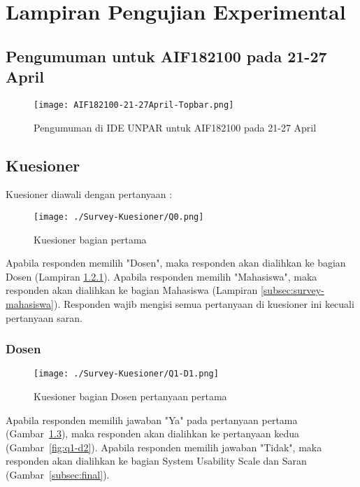 \chapter{Lampiran Pengujian Experimental}
\label{lamp:B}

\section{Pengumuman untuk AIF182100 pada 21-27 April}
\label{sec:aif182100-21-27Apr}
\begin{figure}[H]
	\centering  
	\texttt{[image: AIF182100-21-27April-Topbar.png]}  
	\caption[Pengumuman di IDE UNPAR untuk AIF182100 pada 21-27 April]{Pengumuman di IDE UNPAR untuk AIF182100 pada 21-27 April} 
	\label{fig:AIF182100-21-27Apr} 
\end{figure}


\section{Kuesioner}
\label{sec:survey}
Kuesioner diawali dengan pertanyaan :
\begin{figure}[H]
	\centering  
	\texttt{[image: ./Survey-Kuesioner/Q0.png]}  
	\caption[Kuesioner bagian pertama]{Kuesioner bagian pertama} 
	\label{fig:q0} 
\end{figure}

Apabila responden memilih "Dosen", maka responden akan dialihkan ke bagian Dosen (Lampiran \ref{subsec:survey-dosen}). Apabila responden memilih "Mahasiswa", maka responden akan dialihkan ke bagian Mahasiswa (Lampiran \ref{subsec:survey-mahasiswa}). Responden wajib mengisi semua pertanyaan di kuesioner ini kecuali pertanyaan saran.

\subsection{Dosen}
\label{subsec:survey-dosen}
\begin{figure}[H]
	\centering  
	\texttt{[image: ./Survey-Kuesioner/Q1-D1.png]}  
	\caption[Kuesioner bagian Dosen pertanyaan pertama]{Kuesioner bagian Dosen pertanyaan pertama} 
	\label{fig:q1-d1} 
\end{figure}

Apabila responden memilih jawaban "Ya" pada pertanyaan pertama (Gambar~\ref{fig:q1-d1}), maka responden akan dialihkan ke pertanyaan kedua (Gambar~\ref{fig:q1-d2}). Apabila responden memilih jawaban "Tidak", maka responden akan dialihkan ke bagian System Usability Scale dan Saran (Gambar~\ref{subsec:final}). 

